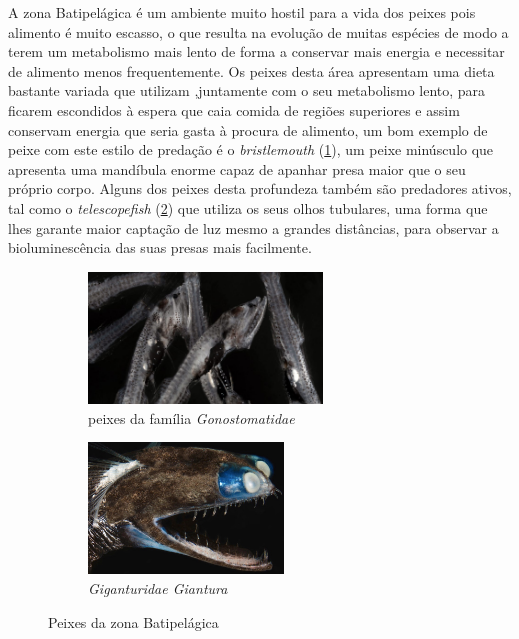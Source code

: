 \documentclass{report}
\begin{document}
A zona Batipelágica é um ambiente muito hostil para a vida dos peixes pois alimento é muito escasso, o que resulta na evolução de muitas espécies de modo a terem um metabolismo mais lento de forma a conservar mais energia e necessitar de alimento menos frequentemente. Os peixes desta área apresentam uma dieta bastante variada que utilizam ,juntamente com o seu metabolismo lento, para ficarem escondidos à espera que caia comida de regiões superiores e assim conservam energia que seria gasta à procura de alimento, um bom exemplo de peixe com este estilo de predação é o \textit{bristlemouth} (\ref{fig:bristlemouth}), um peixe minúsculo que apresenta uma mandíbula enorme capaz de apanhar presa maior que o seu próprio corpo. Alguns dos peixes desta profundeza também são predadores ativos, tal como o \textit{telescopefish} (\ref{fig:telescopefish}) que utiliza os seus olhos tubulares, uma forma que lhes garante maior captação de luz mesmo a grandes distâncias, para observar a bioluminescência das suas presas mais facilmente.

\begin{figure}[H]
\center
    \begin{subfigure}{.5\textwidth}
    \center
        \includegraphics[height=3.5cm]{imagens/Bristlemouth.jpg}
        \caption{ peixes da família \textit{Gonostomatidae }}
        \label{fig:bristlemouth}
    \end{subfigure}%
    \begin{subfigure}{.5\textwidth}
    \center
        \includegraphics[height=3.5cm]{imagens/telescopefish.jpg}
        \caption{\textit{Giganturidae Giantura}}
        \label{fig:telescopefish}
    \end{subfigure}
    \caption{Peixes da zona Batipelágica}
    \label{fig:peixesBati}
\end{figure}
\end{document}
